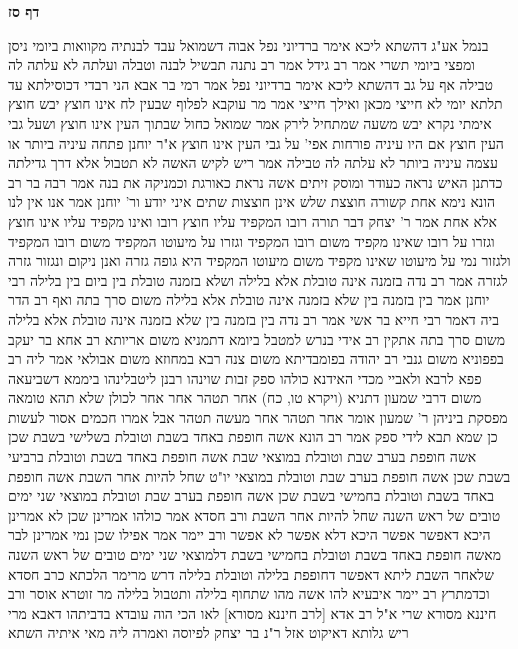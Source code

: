 \documentclass[12pt, openany]{book}
\newcommand{\sethebfont}{
\fontsize{10.5pt}{21.0pt} \selectfont
}
\newcommand{\twocol}[1]{
	{\sethebfont \begin{multicols}{2}
			#1
	\end{multicols}}	
}
\newcommand{\sectname}{}
\newcommand{\newsection}[1]{
	\addcontentsline{toc}{section}{#1}
	\renewcommand{\sectname}{#1}	
	\vspace{-\baselineskip}
	\begin{center}
		\textbf{%
\fontsize{16pt}{16pt}\selectfont
			#1}
	\end{center}
	\vspace{-\baselineskip}
	\nopagebreak
}
\begin{document}
\newsection{דף סז}
\twocol{בנמל אע"ג דהשתא ליכא אימר ברדיוני נפל 
אבוה דשמואל עבד לבנתיה מקוואות ביומי ניסן ומפצי ביומי תשרי 
אמר רב גידל אמר רב  נתנה תבשיל לבנה וטבלה ועלתה לא עלתה לה טבילה אף על גב דהשתא ליכא אימר ברדיוני נפל 
אמר רמי בר אבא  הני רבדי דכוסילתא עד תלתא יומי לא חייצי מכאן ואילך חייצי 
אמר מר עוקבא  לפלוף שבעין לח אינו חוצץ יבש חוצץ  אימתי נקרא יבש משעה שמתחיל לירק 
אמר שמואל  כחול שבתוך העין אינו חוצץ  ושעל גבי העין חוצץ  אם היו עיניה פורחות אפי' על גבי העין אינו חוצץ 
א"ר יוחנן  פתחה עיניה ביותר או עצמה עיניה ביותר לא עלתה לה טבילה 
אמר ריש לקיש  האשה לא תטבול אלא דרך גדילתה  כדתנן  האיש נראה כעודר ומוסק זיתים אשה נראת כאורגת וכמניקה את בנה 
אמר רבה בר רב הונא  נימא אחת קשורה חוצצת
שלש אינן חוצצות שתים איני יודע  ור' יוחנן אמר  אנו אין לנו אלא אחת 
אמר ר' יצחק דבר תורה  רובו המקפיד עליו חוצץ רובו ואינו מקפיד עליו אינו חוצץ  וגזרו על רובו שאינו מקפיד משום רובו המקפיד וגזרו על מיעוטו המקפיד משום רובו המקפיד 
ולגזור נמי על מיעוטו שאינו מקפיד משום מיעוטו המקפיד  היא גופה גזרה ואנן ניקום ונגזור גזרה לגזרה 
אמר רב  נדה בזמנה אינה טובלת אלא בלילה ושלא בזמנה טובלת בין ביום בין בלילה  רבי יוחנן אמר  בין בזמנה בין שלא בזמנה אינה טובלת אלא בלילה משום סרך בתה 
ואף רב הדר ביה דאמר רבי חייא בר אשי אמר רב נדה בין בזמנה בין שלא בזמנה אינה טובלת אלא בלילה משום סרך בתה
אתקין רב אידי בנרש למטבל ביומא דתמניא משום אריותא רב אחא בר יעקב בפפוניא משום גנבי
רב יהודה בפומבדיתא משום צנה רבא במחוזא משום אבולאי 
אמר ליה רב פפא לרבא ולאביי  מכדי האידנא כולהו ספק זבות שוינהו רבנן ליטבלינהו ביממא דשביעאה 
משום דרבי שמעון דתניא  (ויקרא טו, כח) אחר תטהר אחר אחר לכולן שלא תהא טומאה מפסקת ביניהן  ר' שמעון אומר  אחר תטהר אחר מעשה תטהר 
אבל אמרו חכמים  אסור לעשות כן שמא תבא לידי ספק
אמר רב הונא  אשה חופפת באחד בשבת וטובלת בשלישי בשבת שכן אשה חופפת בערב שבת וטובלת במוצאי שבת 
אשה חופפת באחד בשבת וטובלת ברביעי בשבת שכן אשה חופפת בערב שבת וטובלת במוצאי יו"ט שחל להיות אחר השבת 
אשה חופפת באחד בשבת וטובלת בחמישי בשבת שכן אשה חופפת בערב שבת וטובלת במוצאי שני ימים טובים של ראש השנה שחל להיות אחר השבת 
ורב חסדא אמר  כולהו אמרינן שכן לא אמרינן היכא דאפשר אפשר היכא דלא אפשר לא אפשר 
ורב יימר אמר  אפילו שכן נמי אמרינן לבר מאשה חופפת באחד בשבת וטובלת בחמישי בשבת דלמוצאי שני ימים טובים של ראש השנה שלאחר השבת ליתא דאפשר דחופפת בלילה וטובלת בלילה 
דרש מרימר  הלכתא כרב חסדא וכדמתרץ רב יימר 
איבעיא להו  אשה מהו שתחוף בלילה ותטבול בלילה  מר זוטרא אוסר ורב חיננא מסורא שרי 
א"ל רב אדא [לרב חיננא מסורא]  לאו הכי הוה עובדא בדביתהו דאבא מרי ריש גלותא דאיקוט אזל ר"נ בר יצחק לפיוסה  ואמרה ליה  מאי איתיה השתא}
\end{document}
